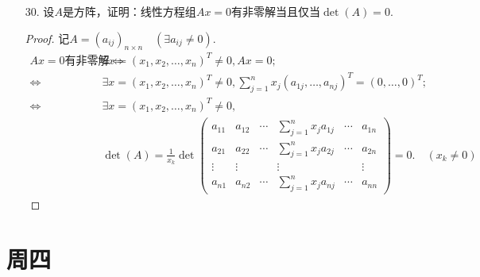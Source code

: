 \documentclass{article}
\begin{document}
\begin{enumerate}
\begin{proof}
\begin{align*}
        \end{align*}        
        $A^T$也满足每行、每列元素之和都是0，则可得
        \[A_{ij}={(A^T)}_{ji}={(A^T)}_{yi}=A_{iy}.\quad (\forall 1\leq i,j,y\leq n)\]
        综合以上可得\[A_{ij}=A_{xy}.\quad (\forall 1\leq i,j,x,y\leq n)\]
    \end{proof}
    \item [30.]设$A$是方阵，证明：线性方程组$Ax=0$有非零解当且仅当$\det(A)=0$.
    \begin{proof}
        记$A={(a_{ij})}_{n\times n}\quad (\exists a_{ij}\neq 0)$.
            \begin{align*}
                Ax=0\mbox{有非零解}
                \Leftrightarrow & \exists x={(x_1,x_2,\ldots,x_n)}^T\neq 0,Ax=0;\\
                \Leftrightarrow & \exists x={(x_1,x_2,\ldots,x_n)}^T\neq 0,\sum\limits_{j=1}^{n} x_j {(a_{1j},\ldots,a_{nj})}^T={(0,\ldots,0)}^T;\\
                \Leftrightarrow & \exists x={(x_1,x_2,\ldots,x_n)}^T\neq 0,\\
                &\det(A)=\frac{1}{x_k}\det
                \begin{pmatrix}
                    a_{11} & a_{12} & \cdots & \sum\limits_{j=1}^{n} x_{j} a_{1j} & \cdots & a_{1n}\\
                    a_{21} & a_{22} & \cdots & \sum\limits_{j=1}^{n} x_{j} a_{2j} & \cdots & a_{2n}\\
                    \vdots & \vdots &        & \vdots                             &        & \vdots\\
                    a_{n1} & a_{n2} & \cdots & \sum\limits_{j=1}^{n} x_{j} a_{nj} & \cdots & a_{nn}
                \end{pmatrix}
                =0.\quad(x_k\neq 0)
            \end{align*}
    \end{proof}
\end{enumerate}
\section{周四}
\end{document}
